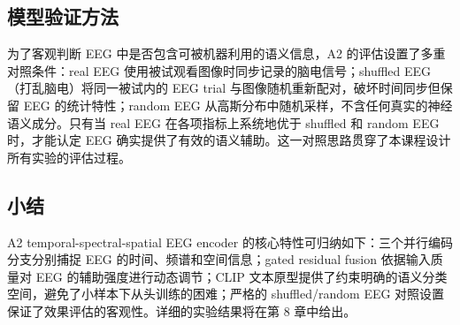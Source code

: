 \subsection{模型验证方法}

为了客观判断 EEG 中是否包含可被机器利用的语义信息，A2 的评估设置了多重对照条件：real EEG 使用被试观看图像时同步记录的脑电信号；shuffled EEG（打乱脑电）将同一被试内的 EEG trial 与图像随机重新配对，破坏时间同步但保留 EEG 的统计特性；random EEG 从高斯分布中随机采样，不含任何真实的神经语义成分。只有当 real EEG 在各项指标上系统地优于 shuffled 和 random EEG 时，才能认定 EEG 确实提供了有效的语义辅助。这一对照思路贯穿了本课程设计所有实验的评估过程。

\subsection{小结}

A2 temporal-spectral-spatial EEG encoder 的核心特性可归纳如下：三个并行编码分支分别捕捉 EEG 的时间、频谱和空间信息；gated residual fusion 依据输入质量对 EEG 的辅助强度进行动态调节；CLIP 文本原型提供了约束明确的语义分类空间，避免了小样本下从头训练的困难；严格的 shuffled/random EEG 对照设置保证了效果评估的客观性。详细的实验结果将在第 8 章中给出。
